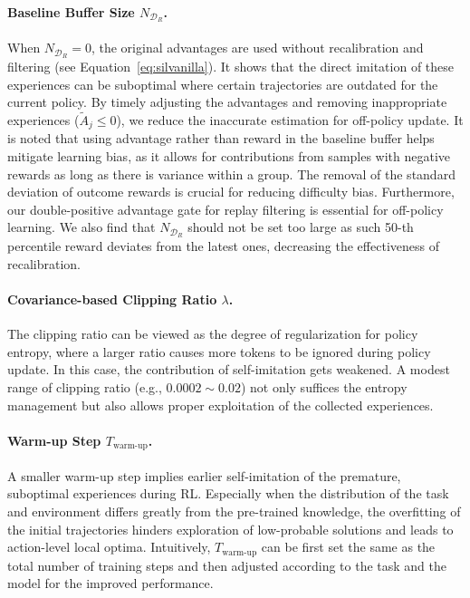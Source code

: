\documentclass[]{youtu} %
\begin{document}
\paragraph{Baseline Buffer Size $N_{\mathcal{D}_R}$.}
When $N_{\mathcal{D}_R}=0$,
the original advantages are used without recalibration and filtering (see Equation~\ref{eq:silvanilla}).
It shows that the direct imitation of these experiences can be suboptimal where certain trajectories are outdated for the current policy.
By timely adjusting the advantages and removing inappropriate experiences ($\tilde{A}_{j}\leq0$),
we reduce the inaccurate estimation for off-policy update.
{
It is noted that using advantage rather than reward in the baseline buffer helps mitigate learning bias, as it allows for contributions from samples with negative rewards as long as there is variance within a group.
The removal of the standard deviation of outcome rewards is crucial for reducing difficulty bias.
Furthermore, our double-positive advantage gate for replay filtering is essential for off-policy learning.
}
We also find that $N_{\mathcal{D}_R}$ should not be set too large as such 50-th percentile reward deviates from the latest ones,
decreasing the effectiveness of recalibration.





\paragraph{Covariance-based Clipping Ratio $\lambda$.}
The clipping ratio can be viewed as the degree of regularization for policy entropy,
where a larger ratio causes more tokens to be ignored during policy update.
In this case,
the contribution of self-imitation gets weakened.
A modest range of clipping ratio (e.g., $0.0002\sim0.02$) not only suffices the entropy management but also allows proper exploitation of the collected experiences.


\paragraph{Warm-up Step $T_{\text{warm-up}}$.}
A smaller warm-up step implies earlier self-imitation of the premature, suboptimal experiences during RL.
Especially when the distribution of the task and environment differs greatly from the pre-trained knowledge,
the overfitting of the initial trajectories hinders exploration of low-probable solutions and leads to action-level local optima.
Intuitively,
$T_{\text{warm-up}}$ can be first set the same as the total number of training steps and then adjusted according to the task and the model for the improved performance.
\end{document}
